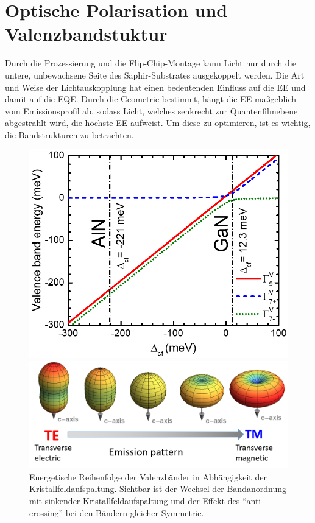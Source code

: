 \thispagestyle{fancy}

\newpage
\section{Optische Polarisation und Valenzbandstuktur}
\label{chap:polgrund}
%
Durch die Prozessierung und die Flip-Chip-Montage kann Licht nur durch die untere, unbewachsene Seite des Saphir-Substrates ausgekoppelt werden. Die Art und Weise der Lichtauskopplung hat einen bedeutenden Einfluss auf die EE und damit auf die EQE. Durch die Geometrie bestimmt, hängt die EE maßgeblich vom Emissionsprofil ab, sodass Licht, welches senkrecht zur Quantenfilmebene abgestrahlt wird, die höchste EE aufweist. Um diese zu optimieren, ist es wichtig, die Bandstrukturen zu betrachten.
\begin{figure}[H]
    \centering
    \begin{minipage}[t]{0.49\linewidth}
        \centering
        \includegraphics[width=\linewidth]{Bilder/vancebandPlot.png}
        \caption{Energetische Reihenfolge der Valenzbänder in Abhängigkeit der Kristallfeldaufspaltung. Sichtbar ist der Wechsel der Bandanordnung mit sinkender Kristallfeldaufspaltung und der Effekt des "`anti-crossing"' bei den Bändern gleicher Symmetrie. \cite{doi:10.1063/1.4932651}    }
        \label{fig:auger5k}
    \end{minipage}%
    \hfill
    \begin{minipage}[t]{0.49\linewidth}
        \centering
        \includegraphics[width=\linewidth]{Bilder/martinTETM.png}

\end{minipage}
\end{figure}
